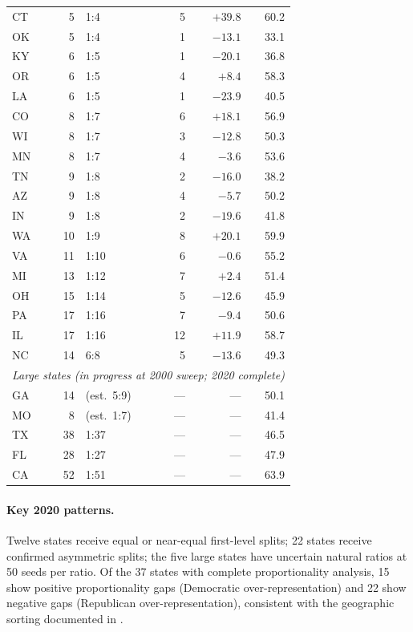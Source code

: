 \begin{table}[h]
\begin{tabular}{l r l r r r}
CT  &  5 & 1:4  &  5 & $+39.8$ & 60.2 \\
OK  &  5 & 1:4  &  1 & $-13.1$ & 33.1 \\
KY  &  6 & 1:5  &  1 & $-20.1$ & 36.8 \\
OR  &  6 & 1:5  &  4 & $+8.4$  & 58.3 \\
LA  &  6 & 1:5  &  1 & $-23.9$ & 40.5 \\
CO  &  8 & 1:7  &  6 & $+18.1$ & 56.9 \\
WI  &  8 & 1:7  &  3 & $-12.8$ & 50.3 \\
MN  &  8 & 1:7  &  4 & $-3.6$  & 53.6 \\
TN  &  9 & 1:8  &  2 & $-16.0$ & 38.2 \\
AZ  &  9 & 1:8  &  4 & $-5.7$  & 50.2 \\
IN  &  9 & 1:8  &  2 & $-19.6$ & 41.8 \\
WA  & 10 & 1:9  &  8 & $+20.1$ & 59.9 \\
VA  & 11 & 1:10 &  6 & $-0.6$  & 55.2 \\
MI  & 13 & 1:12 &  7 & $+2.4$  & 51.4 \\
OH  & 15 & 1:14 &  5 & $-12.6$ & 45.9 \\
PA  & 17 & 1:16 &  7 & $-9.4$  & 50.6 \\
IL  & 17 & 1:16 & 12 & $+11.9$ & 58.7 \\
NC  & 14 & 6:8  &  5 & $-13.6$ & 49.3 \\
\midrule
\multicolumn{6}{l}{\textit{Large states (in progress at 2000 sweep; 2020 complete)}} \\
GA  & 14 & (est.\ 5:9) & --- & --- & 50.1 \\
MO  &  8 & (est.\ 1:7) & --- & --- & 41.4 \\
TX  & 38 & 1:37 & --- & --- & 46.5 \\
FL  & 28 & 1:27 & --- & --- & 47.9 \\
CA  & 52 & 1:51 & --- & --- & 63.9 \\
\bottomrule
\end{tabular}
\end{table}

\paragraph{Key 2020 patterns.}
Twelve states receive equal or near-equal first-level splits;
22 states receive confirmed asymmetric splits;
the five large states have uncertain natural ratios at 50 seeds per ratio.
Of the 37 states with complete proportionality analysis, 15 show positive
proportionality gaps (Democratic over-representation) and 22 show negative
gaps (Republican over-representation), consistent with the geographic sorting
documented in \citet{rodden2019}.

